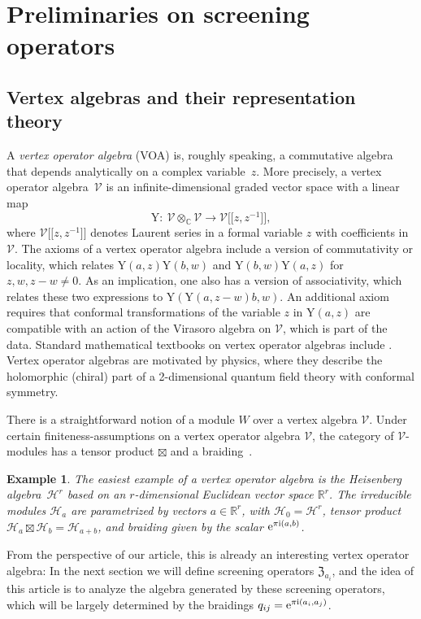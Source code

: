\documentclass[pdftex]{sigma}%
\numberwithin{equation}{section}
\newtheorem{ese}[teo]{Example}
\newcommand{\C}{\mathbb{C}}
\newcommand{\Y}{\mathrm{Y}}
\newcommand{\zem}{\mathfrak{Z}}
\begin{document}
\newcommand{\V}{\mathcal{V}}
\section{Preliminaries on screening operators}\label{section3}
\subsection{Vertex algebras and their representation theory}\label{VOAREP}
A \emph{vertex operator algebra} (VOA) is, roughly speaking, a commutative algebra that depends analytically on a complex variable~$z$. More precisely, a vertex operator algebra~$\V$ is an infinite-dimensional graded vector space with a linear map
\[\Y\colon \ \V\otimes_\C \V\to \V\big[\big[z,z^{-1}\big]\big],\]
where $\V\big[\big[z,z^{-1}\big]\big]$ denotes Laurent series in a formal variable $z$ with coefficients in~$\V$. The axioms of a vertex operator algebra include a version of commutativity or locality, which relates $\Y(a,z)\Y(b,w)$ and $\Y(b,w)\Y(a,z)$ for $z,w,z-w\neq 0$. As an implication, one also has a version of associativity, which relates these two expressions to $\Y(\Y(a,z-w)b,w)$.
An additional axiom requires that conformal transformations of the variable $z$ in $\Y(a,z)$ are compatible with an action of the Virasoro algebra on $\V$, which is part of the data. Standard mathematical textbooks on vertex operator algebras include \cite{FBZ04, Kac98}. Vertex operator algebras are motivated by physics, where they describe the holomorphic (chiral) part of a 2-dimensional quantum field theory with conformal symmetry.

There is a straightforward notion of a module $W$ over a vertex algebra $\V$. Under certain finiteness-assumptions on a vertex operator algebra $\mathcal{V}$, the category of $\mathcal{V}$-modules has a tensor product $\boxtimes$ and a braiding~\cite{HLZ10}.

\begin{ese}
 The easiest example of a vertex operator algebra is the Heisenberg algebra~$\mathcal{H}^r$ based on an $r$-dimensional Euclidean vector space $\mathbb{R}^r$. The irreducible modules $\mathcal{H}_a$ are pa\-ra\-met\-ri\-zed by vectors $a\in\mathbb{R}^r$, with $\mathcal{H}_0=\mathcal{H}^r$, tensor product $\mathcal{H}_a\boxtimes \mathcal{H}_b=\mathcal{H}_{a+b}$, and braiding given by the scalar ${\rm e}^{\pi {\rm i}(a,b)}$.
\end{ese}

From the perspective of our article, this is already an interesting vertex operator algebra: In the next section we will define screening operators $\zem_{a_i}$, and the idea of this article is to analyze the algebra generated by these screening operators, which will be largely determined by the braidings $q_{ij}={\rm e}^{\pi {\rm i}(a_i,a_j)}$.
\end{document}
